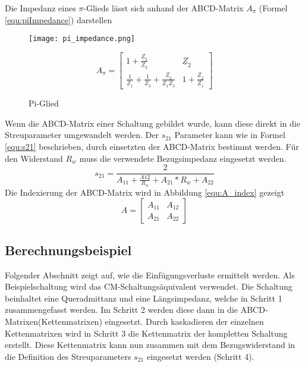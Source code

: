 Die Impedanz eines  $\pi$-Glieds lässt sich anhand der ABCD-Matrix $A_\pi$ (Formel \ref{equ:piImpedance}) darstellen
\begin{figure}[H]
	\begin{minipage}[h]{0.45\linewidth}
		\centering
		\texttt{[image: pi\_impedance.png]}
		\label{fig:piImpedance}
		\caption{Pi-Glied \cite{2torTabelle}}
	\end{minipage}
	\begin{minipage}[h]{0.45\linewidth}
		\begin{equation}\label{equ:piImpedance}
			A_\pi = \left[\begin{matrix}
			1+\frac{\underline{Z}_2}{\underline{Z}_3}&\underline{Z}_2\\
			\frac{1}{\underline{Z}_1}+\frac{1}{\underline{Z}_3}+\frac{\underline{Z}_2}{\underline{Z}_1\underline{Z}_3}&1+\frac{\underline{Z}_2}				{\underline{Z}_1}
			\end{matrix}\right]
		\end{equation}
	\end{minipage}
\end{figure}

Wenn die ABCD-Matrix einer Schaltung gebildet wurde, kann diese direkt in die Streuparameter umgewandelt werden. Der $s_{21}$ Parameter kann wie in Formel \ref{equ:s21} beschrieben, durch einsetzten der ABCD-Matrix bestimmt werden. Für den Widerstand $R_w$ muss die verwendete Bezugsimpedanz eingesetzt werden.
\begin{equation}\label{equ:s21}
s_{21} = \frac{2}{A_{11}+\frac{A{12}}{R_w}+A_{21}*R_w+A_{22}}
\end{equation}
Die Indexierung der ABCD-Matrix wird in Abbildung \ref{equ:A_index} gezeigt
\begin{equation}\label{equ:A_index}
	A = \left[\begin{matrix}
	A_{11}&A_{12}\\A_{21}&A_{22}
	\end{matrix}\right]
\end{equation}
\newpage

\subsection{Berechnungsbeispiel} \label{subsec:beispiel}
Folgender Abschnitt zeigt auf, wie die Einfügungsverluste ermittelt werden. Als Beispielschaltung wird das CM-Schaltungsäquivalent verwendet. Die Schaltung beinhaltet eine Queradmittanz und eine Längsimpedanz, welche in Schritt 1 zusammengefasst werden. Im Schritt 2 werden diese dann in die ABCD-Matrixen(Kettenmatrixen) eingesetzt. Durch kaskadieren der einzelnen Kettenmatrixen wird in Schritt 3 die Kettenmatrix der kompletten Schaltung erstellt. Diese Kettenmatrix kann nun zusammen mit dem Bezugswiderstand in die Definition des Streuparameters $s_{21}$ eingesetzt werden (Schritt 4).

